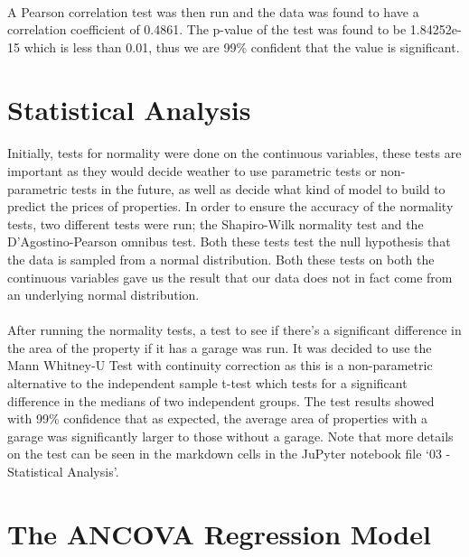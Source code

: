 \paragraph{ }A Pearson correlation test was then run and the data was found to have a correlation coefficient of 0.4861. The p-value of the test was found to be 1.84252e-15 which is less than 0.01, thus we are 99\% confident that the value is significant.

\section{Statistical Analysis}
\paragraph{ }Initially, tests for normality were done on the continuous variables, these tests are important as they would decide weather to use parametric tests or non-parametric tests in the future, as well as decide what kind of model to build to predict the prices of properties. In order to ensure the accuracy of the normality tests, two different tests were run; the Shapiro-Wilk normality test and the D'Agostino-Pearson omnibus test. Both these tests test the null hypothesis that the data is sampled from a normal distribution. Both these tests on both the continuous variables gave us the result that our data does not in fact come from an underlying normal distribution.

\paragraph{ }After running the normality tests, a test to see if there's a significant difference in the area of the property if it has a garage was run. It was decided to use the Mann Whitney-U Test with continuity correction as this is a non-parametric alternative to the independent sample t-test which tests for a significant difference in the medians of two independent groups. The test results showed with 99\% confidence that as expected, the average area of properties with a garage was significantly larger to those without a garage. Note that more details on the test can be seen in the markdown cells in the JuPyter notebook file `03 - Statistical Analysis'.

\section{The ANCOVA Regression Model}
